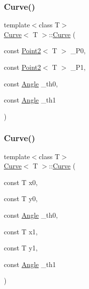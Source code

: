 \mbox{\label{class_curve_a8273498ecf9db747d2449fd0afc4702f}} 
\subsubsection{\texorpdfstring{Curve()}{Curve()}\hspace{0.1cm}{\footnotesize\ttfamily [3/4]}}
{\footnotesize\ttfamily template$<$class T$>$ \\
\mbox{\hyperlink{class_curve}{Curve}}$<$ T $>$\+::\mbox{\hyperlink{class_curve}{Curve}} (\begin{DoxyParamCaption}\item[{const \mbox{\hyperlink{class_point2}{Point2}}$<$ T $>$}]{\+\_\+\+P0,  }\item[{const \mbox{\hyperlink{class_point2}{Point2}}$<$ T $>$}]{\+\_\+\+P1,  }\item[{const \mbox{\hyperlink{class_angle}{Angle}}}]{\+\_\+th0,  }\item[{const \mbox{\hyperlink{class_angle}{Angle}}}]{\+\_\+th1 }\end{DoxyParamCaption})\hspace{0.3cm}{\ttfamily [inline]}}

\mbox{\label{class_curve_a96b350c1818163ee7491f7474938a36d}} 
\subsubsection{\texorpdfstring{Curve()}{Curve()}\hspace{0.1cm}{\footnotesize\ttfamily [4/4]}}
{\footnotesize\ttfamily template$<$class T$>$ \\
\mbox{\hyperlink{class_curve}{Curve}}$<$ T $>$\+::\mbox{\hyperlink{class_curve}{Curve}} (\begin{DoxyParamCaption}\item[{const T}]{x0,  }\item[{const T}]{y0,  }\item[{const \mbox{\hyperlink{class_angle}{Angle}}}]{\+\_\+th0,  }\item[{const T}]{x1,  }\item[{const T}]{y1,  }\item[{const \mbox{\hyperlink{class_angle}{Angle}}}]{\+\_\+th1 }\end{DoxyParamCaption})\hspace{0.3cm}{\ttfamily [inline]}}



